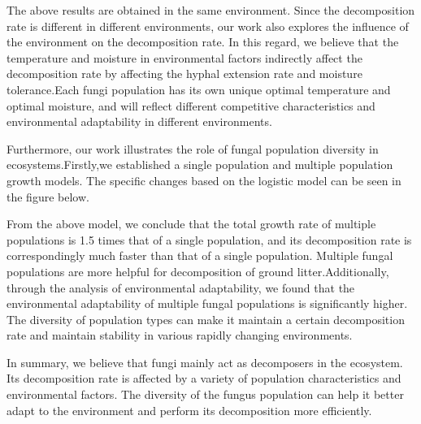 \documentclass{mcmthesis}
\begin{document}
\begin{figure}[h]
	\centering 
\end{figure}

The above results are obtained in the same environment. Since the decomposition rate is different in different environments, our work also explores the influence of the environment on the decomposition rate. In this regard, we believe that the temperature and moisture in environmental factors indirectly affect the decomposition rate by affecting the hyphal extension rate and moisture tolerance.Each fungi population has its own unique optimal temperature and optimal moisture, and will reflect different competitive characteristics and environmental adaptability in different environments.

Furthermore, our work illustrates the role of fungal population diversity in ecosystems.Firstly,we established a single population and multiple population growth models. The specific changes based on the logistic model can be seen in the figure below.
\begin{figure}[h]
	\centering 
\end{figure}

From the above model, we conclude that the total growth rate of multiple populations is 1.5 times that of a single population, and its decomposition rate is correspondingly much faster than that of a single population. Multiple fungal populations are more helpful for decomposition of ground litter.Additionally, through the analysis of environmental adaptability, we found that the environmental adaptability of multiple fungal populations is significantly higher. The diversity of population types can make it maintain a certain decomposition rate and maintain stability in various rapidly changing environments.
\begin{figure}[h]
	\centering 
\end{figure}

In summary, we believe that fungi mainly act as decomposers in the ecosystem. Its decomposition rate is affected by a variety of population characteristics and environmental factors. The diversity of the fungus population can help it better adapt to the environment and perform its decomposition more efficiently.
\end{document}
